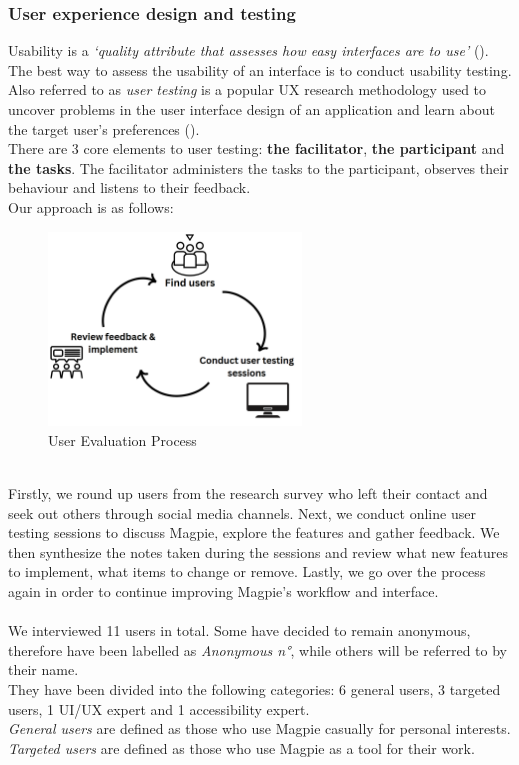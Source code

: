 \subsubsection{User experience design and testing}
Usability is a \emph{`quality attribute that assesses how easy interfaces are to use'} (\cite{usabilitycomponentsnielsen}). The best way to assess the usability of an interface is to conduct usability testing.\\
Also referred to as \emph{user testing} is a popular UX research methodology used to uncover problems in the user interface design of an application and learn about the target user's preferences (\cite{usertestingdefinition}).\\

\noindent There are 3 core elements to user testing: \textbf{the facilitator}, \textbf{the participant} and \textbf{the tasks}. The facilitator administers the tasks to the participant, observes their behaviour and listens to their feedback.\\

\noindent Our approach is as follows:
\begin{figure}[h!]
    \centering
    \includegraphics[width=0.6\textwidth]{images/user-eval-process.png}
    \caption{User Evaluation Process}
\end{figure}\\
Firstly, we round up users from the research survey who left their contact and seek out others through social media channels. Next, we conduct online user testing sessions to discuss Magpie, explore the features and gather feedback. We then synthesize the notes taken during the sessions and review what new features to implement, what items to change or remove. Lastly, we go over the process again in order to continue improving Magpie's workflow and interface.\\ \\
We interviewed 11 users in total. Some have decided to remain anonymous, therefore have been labelled as \emph{Anonymous n°}, while others will be referred to by their name. \\ They have been divided into the following categories: 6 general users, 3 targeted users, 1 UI/UX expert and 1 accessibility expert.\\
\emph{General users} are defined as those who use Magpie casually for personal interests.\\ \emph{Targeted users} are defined as those who use Magpie as a tool for their work.

